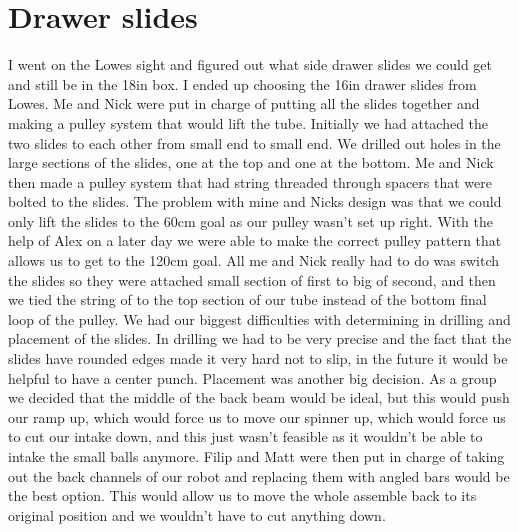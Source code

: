 \section*{Drawer slides}
I went on the Lowes sight and figured out what side drawer slides we could get and still be in the 18in box. I ended up choosing the 16in drawer slides from Lowes. Me and Nick were put in charge of putting all the slides together and making a pulley system that would lift the tube. Initially we had attached the two slides to each other from small end to small end. We drilled out holes in the large sections of the slides, one at the top and one at the bottom. Me and Nick then made a pulley system that had string threaded through spacers that were bolted to the slides. The problem with mine and Nicks design was that we could only lift the slides to the 60cm goal as our pulley wasn’t set up right. With the help of Alex on a later day we were able to make the correct pulley pattern that allows us to get to the 120cm goal. All me and Nick really had to do was switch the slides so they were attached small section of first to big of second, and then we tied the string of to the top section of our tube instead of the bottom final loop of the pulley. We had our biggest difficulties with determining in drilling and placement of the slides. In drilling we had to be very precise and the fact that the slides have rounded edges made it very hard not to slip, in the future it would be helpful to have a center punch. Placement was another big decision. As a group we decided that the middle of the back beam would be ideal, but this would push our ramp up, which would force us to move our spinner up, which would force us to cut our intake down, and this just wasn’t feasible as it wouldn’t be able to intake the small balls anymore. Filip and Matt were then put in charge of taking out the back channels of our robot and replacing them with angled bars would be the best option. This would allow us to move the whole assemble back to its original position and we wouldn’t have to cut anything down. 

